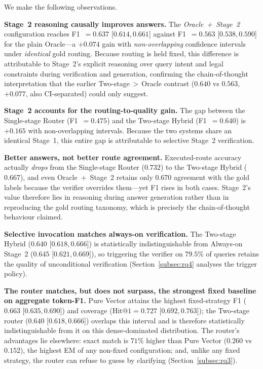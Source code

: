 We make the following observations.

\noindent\textbf{Stage~2 reasoning causally improves answers.} The
\textit{Oracle~+~Stage~2} configuration reaches F1~$=0.637$
{\scriptsize[$0.614, 0.661$]} against F1~$=0.563$
{\scriptsize[$0.538, 0.590$]} for the plain Oracle---a $+0.074$ gain with
\emph{non-overlapping} confidence intervals under \emph{identical} gold
routing. Because routing is held fixed, this difference is attributable to
Stage~2's explicit reasoning over query intent and legal constraints during
verification and generation, confirming the chain-of-thought interpretation
that the earlier Two-stage$\,>\,$Oracle contrast ($0.640$ vs $0.563$,
$+0.077$, also CI-separated) could only suggest.

\noindent\textbf{Stage~2 accounts for the routing-to-quality gain.} The gap
between the Single-stage Router (F1~$=0.475$) and the Two-stage Hybrid
(F1~$=0.640$) is $+0.165$ with non-overlapping intervals. Because the two
systems share an identical Stage~1, this entire gap is attributable to
selective Stage~2 verification.

\noindent\textbf{Better answers, not better route agreement.} Executed-route
accuracy actually \emph{drops} from the Single-stage Router ($0.732$) to the
Two-stage Hybrid ($0.667$), and even Oracle~+~Stage~2 retains only $0.670$
agreement with the gold labels because the verifier overrides them---yet F1
rises in both cases. Stage~2's value therefore lies in reasoning during
answer generation rather than in reproducing the gold routing taxonomy, which
is precisely the chain-of-thought behaviour claimed.

\noindent\textbf{Selective invocation matches always-on verification.} The
Two-stage Hybrid ($0.640$ {\scriptsize[$0.618, 0.666$]}) is statistically
indistinguishable from Always-on Stage~2 ($0.645$
{\scriptsize[$0.621, 0.669$]}), so triggering the verifier on $79.5\%$ of
queries retains the quality of unconditional verification
(Section~\ref{subsec:rq4} analyses the trigger policy).

\noindent\textbf{The router matches, but does not surpass, the strongest
fixed baseline on aggregate token-F1.} Pure Vector attains the highest
fixed-strategy F1 ($0.663$ {\scriptsize[$0.635, 0.690$]}) and coverage
(Hit@$1=0.727$ {\scriptsize[$0.692, 0.763$]}); the Two-stage router
($0.640$ {\scriptsize[$0.618, 0.666$]}) overlaps this interval and is
therefore statistically indistinguishable from it on this dense-dominated
distribution. The router's advantages lie elsewhere: exact match is $71\%$
higher than Pure Vector ($0.260$ vs $0.152$), the highest EM of any
non-fixed configuration; and, unlike any fixed strategy, the router can
refuse to guess by clarifying (Section~\ref{subsec:rq3}).

